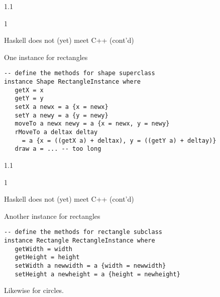 \documentclass{slides}
\newenvironment{myslide}{\begin{slide}\color{Blue}\begin{boxedminipage}{1.1\hsize}\begin{boxedminipage}{1\hsize}\color{Black}
\vspace{-170\in}
}{%
\smallskip
\end{boxedminipage}
\end{boxedminipage}
\end{slide}}
\newenvironment{myslide}{\begin{slide}
}{%
\end{slide}}
\newenvironment{myslide}{\begin{slide}\color{White}\begin{boxedminipage}{1.1\hsize}\color{Black}
\vspace{-170\in}
}{%
\smallskip
\end{boxedminipage}
\end{slide}}
\newcommand{\header}[1]{{\large \color{Red} #1}}
\begin{document}



\begin{myslide}

\header{Haskell does not (yet) meet C++ (cont'd)}

One instance for rectangles

{\tiny

\begin{verbatim}
-- define the methods for shape superclass
instance Shape RectangleInstance where
   getX = x
   getY = y
   setX a newx = a {x = newx}
   setY a newy = a {y = newy}
   moveTo a newx newy = a {x = newx, y = newy}
   rMoveTo a deltax deltay
     = a {x = ((getX a) + deltax), y = ((getY a) + deltay)}
   draw a = ... -- too long
\end{verbatim}

}

\end{myslide}






\begin{myslide}

\header{Haskell does not (yet) meet C++ (cont'd)}

Another instance for rectangles

{\tiny

\begin{verbatim}
-- define the methods for rectangle subclass
instance Rectangle RectangleInstance where
   getWidth = width
   getHeight = height
   setWidth a newwidth = a {width = newwidth}
   setHeight a newheight = a {height = newheight}
\end{verbatim}

}

Likewise for circles.

\end{myslide}



\end{document}
